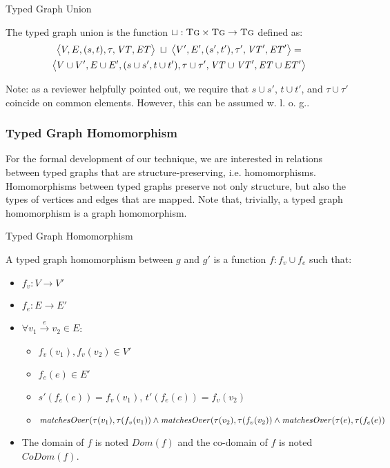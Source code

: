 \begin{definition}{Typed Graph Union\\}
\label{def:typed_graph_union}


The typed graph union is the function $\sqcup :\textsc{Tg}\times \textsc{Tg}\rightarrow \textsc{Tg}$ defined as:
\begin{multline*}
\big\langle V,E,(s,t),\tau,\mathit{VT},\mathit{ET}\big\rangle\;\sqcup\;\big\langle V',E',(s',t'),\tau',\mathit{VT}',\mathit{ET}'\big\rangle=\\\big\langle V\cup V', E\cup
E',(s\cup s', t\cup t'), \tau\cup \tau', \mathit{VT}\cup \mathit{VT}', \mathit{ET}\cup ET'\big\rangle
\end{multline*}
\end{definition}

Note: as a reviewer helpfully pointed out, we require that $s \cup s'$, $t \cup t'$, and $\tau \cup \tau'$ coincide on common elements. However, this can be assumed w. l. o. g..

\subsubsection*{Typed Graph Homomorphism}
For the formal development of our technique, we are interested in relations between typed graphs that are structure-preserving, i.e. homomorphisms. Homomorphisms between typed graphs preserve not only structure, but also the types of vertices and edges that are mapped. Note that, trivially, a typed graph homomorphism is a graph homomorphism.

\begin{definition}{Typed Graph Homomorphism\\}
\label{def:typed_graph_homomorphism}

A typed graph homomorphism between $g$ and $g'$ is a function $f: f_v \cup f_e$ such that:
\begin{itemize}
\item $f_v: V\rightarrow V'$
\item $f_e: E\rightarrow E'$
\item $\forall v_1 \xrightarrow{e} v_2\in E$:
\begin{itemize}
\item $f_v(v_1), f_v(v_2) \in V'$
\item $f_e(e) \in E'$
\item $s'(f_e(e)) = f_v(v_1)$, $t'(f_e(e)) = f_v(v_2)$
\item $\mathit{matchesOver}(\tau(v_1), \tau(f_v(v_1)) \land \\\mathit{matchesOver}(\tau(v_2), \tau(f_v(v_2)) \land\\ \mathit{matchesOver}(\tau(e), \tau(f_e(e))$
\end{itemize}

\item The domain of $f$ is noted $Dom(f)$ and the co-domain of $f$ is noted $CoDom(f)$.
\end{itemize}  
\end{definition}

